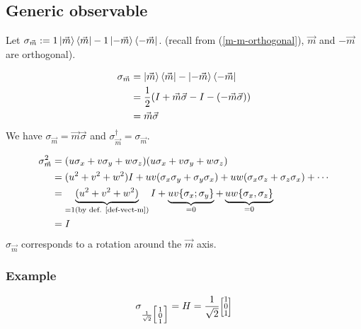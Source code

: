 \documentclass{article}
\newcommand{\colvec}[2][.8]{%
  \scalebox{#1}{%
    \renewcommand{\arraystretch}{.7}%
    $\begin{bmatrix}#2\end{bmatrix}$%
  }
}
\begin{document}
\subsection{Generic observable}
Let
$\sigma_{\vec{m}}:=1\ket{\vec{m}}\bra{\vec{m}}-1\ket{-\vec{m}}\bra{-\vec{m}}$.
(recall from (\ref{m-m-orthogonal}), $\vec{m}$ and $-\vec{m}$ are orthogonal).

\begin{equation}
    \begin{aligned}
        \sigma_{\vec{m}}
            & = \ket{\vec{m}}\bra{\vec{m}}-\ket{-\vec{m}}\bra{-\vec{m}} \\
            & = \frac{1}{2}(I+\vec{m}\vec{\sigma}-I-(-\vec{m}\vec{\sigma})) \\
            & = \vec{m}\vec{\sigma}
    \end{aligned}
\end{equation}
\noindent
We have $\sigma_{\vec{m}}=\vec{m}\vec{\sigma}$ and
$\sigma_{\vec{m}}^\dagger=\sigma_{\vec{m}}$.

\begin{equation}
    \begin{aligned}
        \sigma_{\vec{m}}^2
            & = (u\sigma_x + v\sigma_y + w\sigma_z)(u\sigma_x + v\sigma_y + w\sigma_z) \\
            & = (u^2 + v^2 + w^2)I + uv (\sigma_x\sigma_y + \sigma_y\sigma_x) +
                uw (\sigma_x\sigma_z + \sigma_z\sigma_x) + \cdots \\
            & = \underbrace{(u^2 + v^2 + w^2)}_{=1 (\text{by def. \ref{def-vect-m}})}I +
                \underbrace{uv\{\sigma_x; \sigma_y\}}_{=0} + \underbrace{uw\{\sigma_x,
                \sigma_z\}}_{=0} \\
            & = I
    \end{aligned}
\end{equation}
$\sigma_{\vec{m}}$ corresponds to a rotation around the $\vec{m}$ axis.

\subsubsection*{Example}
\begin{equation}
\sigma_{\frac{1}{\sqrt{2}}\Big[\begin{smallmatrix} 1\\0\\1 \end{smallmatrix} \Big]} = H = \frac{1}{\sqrt{2}}
\colvec{1\\0\\1}
\end{equation}
\end{document}
